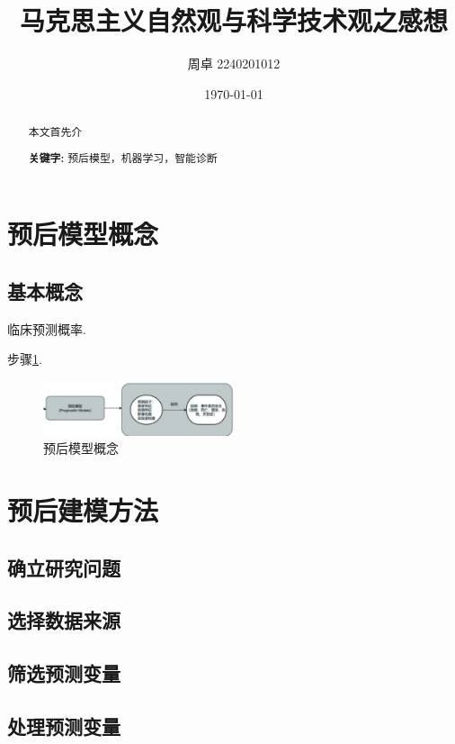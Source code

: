 \documentclass{article}
\begin{document}
\title{马克思主义自然观与科学技术观之感想}
\author{周卓 2240201012}
\date{\today}
\maketitle
\thispagestyle{empty}

\begin{abstract}
    本文首先介
    
    \textbf{关键字:} 预后模型，机器学习，智能诊断
\end{abstract}

\newpage
{}
\tableofcontents
\newpage
{}

\section{预后模型概念}
    \subsection{基本概念}
    临床预测概率\cite{chen2020overview}.

    步骤\ref{fig:a}.
    \begin{figure}[h]
        \centering
        \includegraphics[width=0.5\textwidth]{2fig/a.png}
        \caption{预后模型概念}
        \label{fig:a}
    \end{figure}
    
\section{预后建模方法}
    \subsection{确立研究问题}
    
    
    \subsection{选择数据来源}

    \subsection{筛选预测变量}
   
    \subsection{处理预测变量}
    
\end{document}
